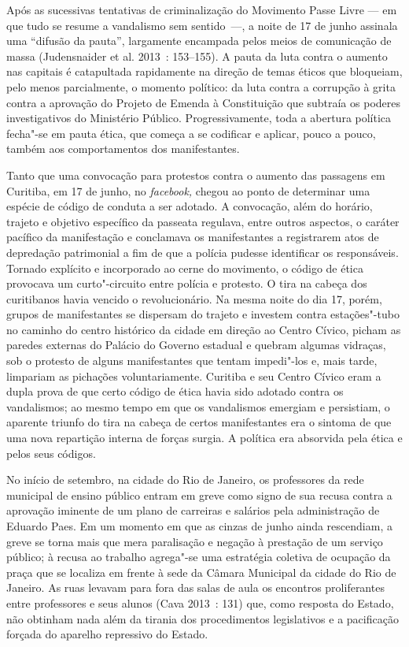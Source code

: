 Após as sucessivas tentativas de
criminalização do Movimento Passe Livre --- em que tudo se resume a
vandalismo sem sentido~---, a noite de 17 de junho assinala uma ``difusão
da pauta'', largamente encampada pelos meios de comunicação de massa
(Judensnaider et al. 2013~: 153--155). A pauta da luta contra o aumento
nas capitais é catapultada rapidamente na direção de temas éticos que
bloqueiam, pelo menos parcialmente, o momento político: da luta contra a
corrupção à grita contra a aprovação do Projeto de Emenda à Constituição
que subtraía os poderes investigativos do Ministério Público.
Progressivamente, toda a abertura política fecha"-se em pauta ética, que
começa a se codificar e aplicar, pouco a pouco, também aos
comportamentos dos manifestantes.

Tanto que uma convocação para protestos contra o aumento das passagens
em Curitiba, em 17 de junho, no \emph{facebook,} chegou ao ponto de
determinar uma espécie de código de conduta a ser adotado. A convocação,
além do horário, trajeto e objetivo específico da passeata regulava,
entre outros aspectos, o caráter pacífico da manifestação e conclamava
os manifestantes a registrarem atos de depredação patrimonial a fim de
que a polícia pudesse identificar os responsáveis. Tornado explícito e
incorporado ao cerne do movimento, o código de ética provocava um
curto"-circuito entre polícia e protesto. O tira na cabeça dos
curitibanos havia vencido o revolucionário. Na mesma noite do dia 17,
porém, grupos de manifestantes se dispersam do trajeto e investem contra
estações"-tubo no caminho do centro histórico da cidade em direção ao
Centro Cívico, picham as paredes externas do Palácio do Governo estadual
e quebram algumas vidraças, sob o protesto de alguns manifestantes que
tentam impedi"-los e, mais tarde, limpariam as pichações voluntariamente.
Curitiba e seu Centro Cívico eram a dupla prova de que certo código de
ética havia sido adotado contra os vandalismos; ao mesmo tempo em que os
vandalismos emergiam e persistiam, o aparente triunfo do tira na cabeça
de certos manifestantes era o sintoma de que uma nova repartição interna
de forças surgia. A política era absorvida pela ética e pelos seus
códigos.

No início de setembro, na cidade do Rio de Janeiro, os professores da
rede municipal de ensino público entram em greve como signo de sua
recusa contra a aprovação iminente de um plano de carreiras e salários
pela administração de Eduardo Paes. Em um momento em que as cinzas de
junho ainda rescendiam, a greve se torna mais que mera paralisação e
negação à prestação de um serviço público; à recusa ao trabalho
agrega"-se uma estratégia coletiva de ocupação da praça que se localiza
em frente à sede da Câmara Municipal da cidade do Rio de Janeiro. As
ruas levavam para fora das salas de aula os encontros proliferantes
entre professores e seus alunos (Cava 2013~: 131) que, como resposta do
Estado, não obtinham nada além da tirania dos procedimentos legislativos
e a pacificação forçada do aparelho repressivo do Estado.

